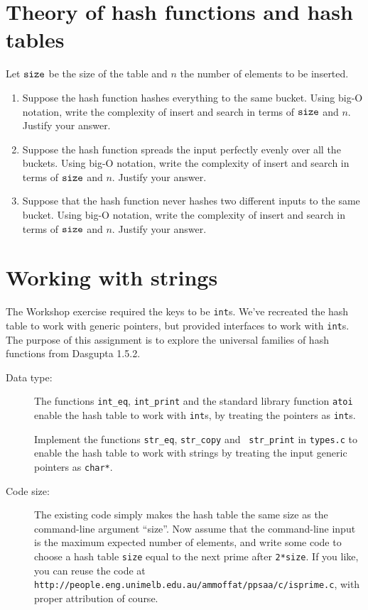 \documentclass[11pt]{article}
\newcommand{\size}{{\tt size}}
\begin{document}
\section*{Theory of hash functions and hash tables}
Let $\size$ be the size of the table and $n$ the number of elements to be inserted.
\begin{enumerate}
        \item Suppose the hash function hashes everything to the same bucket.
            Using big-O notation, write the complexity of insert and search in
            terms of $\size$ and $n$.  Justify your answer.
        \item Suppose the hash function spreads the input perfectly evenly over
            all the buckets.  Using big-O notation, write the complexity of
            insert and search in terms of $\size$ and $n$.  Justify your
            answer.
        \item Suppose that the hash function never hashes two different inputs
            to the same bucket.  Using big-O notation, write the complexity of
            insert and search in terms of $\size$ and $n$.  Justify your
            answer.
      \end{enumerate}

\section*{Working with strings}
The Workshop exercise required the keys to be {\tt int}s. We've recreated the
hash table to work with generic pointers, but provided interfaces to work with
{\tt int}s. The purpose of this assignment is to explore the universal families
of hash functions from Dasgupta 1.5.2.

\begin{description}
    \item[Data type:] The functions {\tt int\_eq}, {\tt int\_print} and the
        standard library function {\tt atoi} enable the hash table to work
        with {\tt int}s, by treating the pointers as {\tt int}s.

        Implement the functions {\tt str\_eq}, {\tt str\_copy} and {\tt
        str\_print} in {\tt types.c} to enable the hash table to work with
        strings by treating the input generic pointers as {\tt char*}.

    \item[Code size:]
        The existing code simply makes the hash table the same size as the command-line argument ``size''.
        Now assume that the command-line input is the maximum expected number of elements,
        and write some code to choose a hash table {\tt size} equal to the next
        prime after {\tt 2*size}.  If you like, you can reuse the code at {\tt
        http://people.eng.unimelb.edu.au/ammoffat/ppsaa/c/isprime.c}, with
        proper attribution of course.
\end{description}
\end{document}
